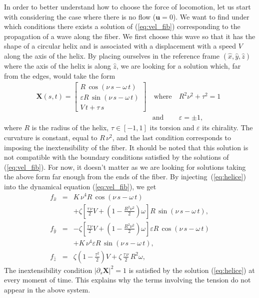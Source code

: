 \documentclass[aps,prl,preprint,groupedaddress]{revtex4-2}
\begin{document}
In order to better understand how to choose the force of locomotion, let us start with considering the case where there is no flow ($\bm u = 0$). We want to find under which conditions there exists a solution of (\ref{eq:vel_fib}) corresponding to the propagation of a wave along the fiber. We first choose this wave so that it has the shape of a circular helix and is associated with a displacement with a speed $V$ along the axis of the helix. By placing ourselves in the reference frame $(\hat{x},\hat{y},\hat{z})$ where the axis of the helix is along $\hat{z}$, we are looking for a solution which, far from the edges, would take the form
\begin{eqnarray}
  \bm X(s,t) = \left[ \begin{array}{c} R\,\cos(\nu\,s-\omega\,t) \\ \varepsilon R\,\sin(\nu\,s-\omega\,t)\\  V\,t+\tau\,s\end{array}\right] &\ \mbox{where}& \ R^2\nu^2+\tau^2 = 1\ \ \nonumber\\ &\mbox{and}& \ \varepsilon = \pm 1 ,
  \label{eq:helice}
\end{eqnarray}
where $R$ is the radius of the helix, $\tau\in[-1,1]$ its torsion and $\varepsilon$ its chirality. The curvature is constant, equal to $R\,\nu^2$, and the last condition corresponds to imposing the inextensibility of the fiber. It should be noted that this solution is not compatible with the boundary conditions satisfied by the solutions of (\ref{eq:vel_fib}). For now, it doesn't matter as we are looking for solutions taking the above form far enough from the ends of the fiber. By injecting~(\ref{eq:helice}) into the dynamical equation (\ref{eq:vel_fib}), we get
\begin{eqnarray}
  f_{\hat{x}} &=& K\,\nu^4 R\,\cos(\nu\,s-\omega\,t) \nonumber\\
  &&+ \zeta \left[\frac{\tau\,\nu}{2}V+\left(1-\frac{R^2\nu^2}{2}\right) \omega\right]R\,\sin(\nu\,s-\omega\,t), \label{eq:fxtmp}\\
  f_{\hat{y}}&=& -\zeta \left[\frac{\tau\,\nu}{2}V+\left(1-\frac{R^2\nu^2}{2}\right) \omega\right]\varepsilon R\, \cos(\nu\,s-\omega\,t) \nonumber\\
  &&+K\,\nu^4 \varepsilon R\,\sin(\nu\,s-\omega\,t), \label{eq:fytmp}\\
   f_{\hat{z}} &=& \zeta\left(1-\frac{\tau^2}{2}\right)V +\zeta\,\frac{\tau\,\nu}{2}\,R^2\omega \label{eq:fztmp},
 \end{eqnarray}
The inextensibility condition $|\partial_s \bm X |^2 = 1$ is satisfied by the solution (\ref{eq:helice}) at every moment of time. This explains why the terms involving the tension do not appear in the above system.
\end{document}
